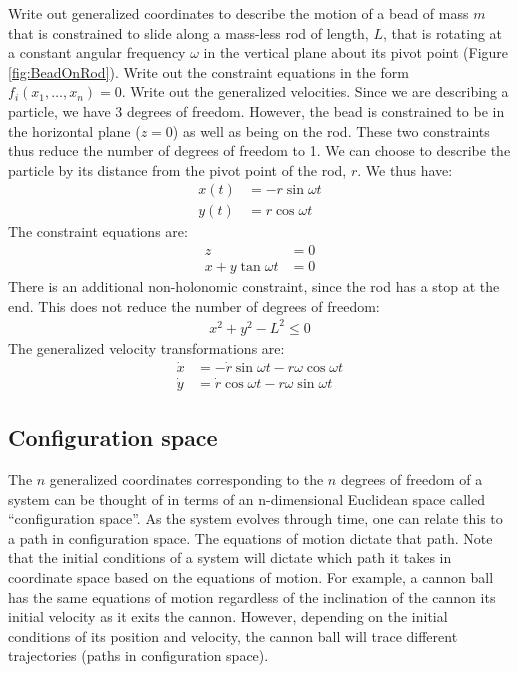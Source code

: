\begin{example}{0pt}{Write out generalized coordinates to describe the motion of a bead of mass $m$ that is constrained to slide along a mass-less rod of length, $L$, that is rotating at a constant angular frequency $\omega$ in the vertical plane about its pivot point (Figure \ref{fig:BeadOnRod}). Write out the constraint equations in the form $f_i(x_1,\dots ,x_n)=0$. Write out the generalized velocities.}{}
Since we are describing a particle, we have 3 degrees of freedom. However, the bead is constrained to be in the horizontal plane ($z=0$) as well as being on the rod. These two constraints thus reduce the number of degrees of freedom to 1. We can choose to describe the particle by its distance from the pivot point of the rod, $r$. We thus have:
\begin{align*}
x(t) &=-r\sin{\omega t}\nonumber\\
y(t) &=r\cos{\omega t}
\end{align*}
The constraint equations are:
\begin{align*}
z&=0\nonumber\\
x+y\tan{\omega t}&=0
\end{align*}
There is an additional non-holonomic constraint, since the rod has a stop at the end. This does not reduce the number of degrees of freedom:
\begin{align*}
x^2+y^2-L^2\leq 0
\end{align*}
The generalized velocity transformations are:
\begin{align*}
\dot{x} &=-\dot{r}\sin{\omega t}-r\omega\cos{\omega t}\\
\dot{y} &=\dot{r}\cos{\omega t}-r\omega\sin{\omega t}
\end{align*}
\end{example}


\subsection{Configuration space}
The $n$ generalized coordinates corresponding to the $n$ degrees of freedom of a system can be thought of in terms of an n-dimensional Euclidean space called ``configuration space''. As the system evolves through time, one can relate this to a path in configuration space. The equations of motion dictate that path. Note that the initial conditions of a system will dictate which path it takes in coordinate space based on the equations of motion. For example, a cannon ball has the same equations of motion regardless of the inclination of the cannon its initial velocity as it exits the cannon. However, depending on the initial conditions of its position and velocity, the cannon ball will trace different trajectories (paths in configuration space). 





